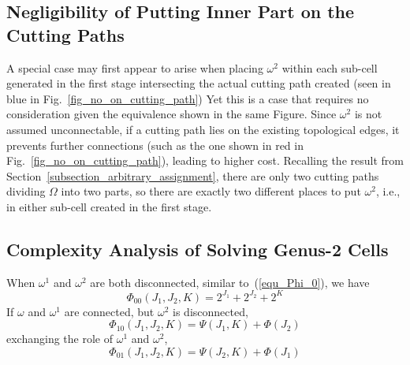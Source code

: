 \documentclass[conference]{IEEEtran}
\begin{document}
\subsection{Negligibility of Putting Inner Part on the Cutting Paths}
A special case may first appear to arise when placing $\omega^2$ within each sub-cell generated in the first stage intersecting 
the actual cutting path created (seen in blue in Fig.~\ref{fig_no_on_cutting_path}) 
Yet this is a case that requires no consideration given the equivalence shown in the same Figure. 
Since $\omega^2$ is not assumed unconnectable, if a cutting path lies on the existing topological edges, it prevents further connections
(such as the one shown in red in Fig.~\ref{fig_no_on_cutting_path}), leading to higher cost. 
Recalling the result from Section~\ref{subsection_arbitrary_assignment}, there are only two cutting paths dividing $\Omega$ into two parts, so there are exactly two different places to put $\omega^2$, i.e., in either sub-cell created in the first stage. 

\subsection{Complexity Analysis of Solving Genus-2 Cells}
\label{subsection_genus_two_complexity}
When $\omega^1$ and $\omega^2$ are both disconnected, similar to~(\ref{equ_Phi_0}), we have
\begin{equation}\label{equ_Phi_00}
\Phi_{00}(J_1, J_2, K) = 2^{J_1} +2^{J_2} + 2^K
\end{equation}
If $\omega$ and $\omega^1$ are connected, but $\omega^2$ is disconnected, 
\begin{equation}\label{equ_Phi_10}
\Phi_{10}(J_1, J_2, K) = \Psi(J_1, K)+\Phi(J_2)
\end{equation}
exchanging the role of $\omega^1$ and $\omega^2$, 
\begin{equation}\label{equ_Phi_01}
\Phi_{01}(J_1, J_2, K) = \Psi(J_2, K) + \Phi(J_1)
\end{equation}
\end{document}
